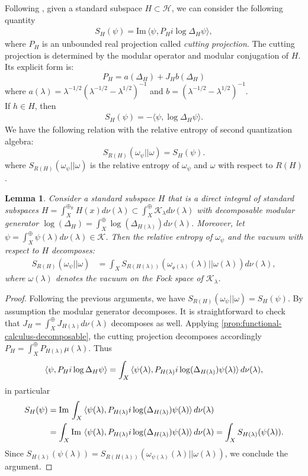 \documentclass[12pt]{article}
\def\RR{{\mathbb R}}
\def\H{{\mathcal H}}
\def\K{{\mathcal K}}
\def\l{\lambda}
\def\Im{\mathrm{Im}\,}
\def\im{\mathrm{Im}\,}
\newtheorem{lemma}[theorem]{Lemma}
\theoremstyle{remark}
\begin{document}
Following \cite{CLR20}, given a standard subspace $H\subset\H$, we can consider the following quantity
\begin{align*}
S_H(\psi)=\Im\langle \psi,P_Hi\log\Delta_H \psi\rangle,
\end{align*}
where $P_H$ is an unbounded real projection called \textit{cutting projection}. The cutting projection is determined by the modular operator and modular conjugation of $H$. Its explicit form is:$$P_H=a(\Delta_H)+ J_Hb(\Delta_H)$$
where $a(\lambda)=\lambda^{-1/2}(\lambda^{-1/2}-\lambda^{1/2})^{-1}$ and $b=(\lambda^{-1/2}-\lambda^{1/2})^{-1}$.\\
If $h\in H$, then 
	\begin{align*}
		S_H(\psi)=-\langle \psi,\log\Delta_H \psi\rangle.
	\end{align*}
We have the following relation with the relative entropy of second quantization algebra:
\[
 S_{R(H)}(\omega_\psi ||\omega)=S_H(\psi).
\]
where $S_{R(H)}(\omega_\psi||\omega)$ is the relative entropy of $\omega_\psi$ and $\omega$ with respect to $R(H)$
\cite[Proposition 4.2]{CLR20}.
\begin{lemma}\label{lem:relative-entropy-decomposition}
	Consider a standard subspace $H$ that is a direct integral of standard subspaces $H=\int_X^{\oplus_\RR} H(x)d\nu(\l)\subset \int_X^\oplus \K_\l d\nu(\l)$ with decomposable modular generator $\log(\Delta_H)=\int^\oplus_X \log(\Delta_{H(\l)})d\nu(\l)$. Moreover, let $\psi=\int^\oplus_X \psi(\l)d\nu(\l)\in \K$. Then the relative entropy of $\omega_\psi$ and the vacuum with respect to $H$ decomposes: 
		\begin{align*}
			S_{R(H)}(\omega_\psi||\omega)&=\int_X S_{R(H(\l))}(\omega_{_\Psi(\l)}(\l)||\omega(\l))d\nu(\l),
		\end{align*}
	where $\omega(\l)$ denotes the vacuum on the Fock space of $\K_\l$.
\end{lemma}
\begin{proof}
	Following the previous arguments, we have $S_{R(H)}(\omega_\psi||\omega)=S_H(\psi)$. By assumption the modular generator decomposes. It is straightforward to check that $J_H=\int^\oplus_X J_{H(\l)}d\nu(\l)$ decomposes as well. Applying \autoref{prop:functional-calculus-decomposable}, the cutting projection decomposes accordingly $P_H=\int^\oplus_X P_{H(\l)}\mu(\l)$. Thus
		$$\langle \psi,P_Hi\log\Delta_H \psi\rangle=\int_X \braket{\psi(\l),P_{H(\l)}i\log(\Delta_{H(\l)})\psi(\l)} d\nu(\l),$$ in particular
		\begin{align*}
			S_H(\psi)&=\im\int_X \braket{\psi(\l),P_{H(\l)}i\log(\Delta_{H(\l)})\psi(\l)} d\nu(\l)\\&=\int_X \im\braket{\psi(\l),P_{H(\l)}i\log(\Delta_{H(\l)})\psi(\l)} d\nu(\l)=\int_X S_{H(\l)}(\psi(\l)).
		\end{align*}
Since $S_{H(\l)}(\psi(\l))=S_{R(H(\l))}(\omega_{\psi(\l)}(\l)||\omega(\l))$, we conclude the argument.
\end{proof}
\end{document}
